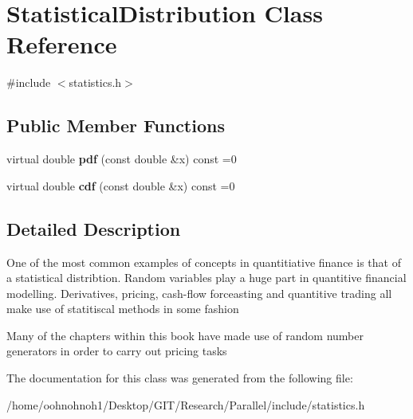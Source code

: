 \hypertarget{classStatisticalDistribution}{}\section{Statistical\+Distribution Class Reference}
\label{classStatisticalDistribution}


{\ttfamily \#include $<$statistics.\+h$>$}

\subsection*{Public Member Functions}
\begin{DoxyCompactItemize}
\item 
\mbox{\label{classStatisticalDistribution_aef1b717d8c6bc58c5b5806d1b935eb12}} 
virtual double {\bfseries pdf} (const double \&x) const =0
\item 
\mbox{\label{classStatisticalDistribution_aa7f52f4c8cadc971d9e189453ea0eb95}} 
virtual double {\bfseries cdf} (const double \&x) const =0
\end{DoxyCompactItemize}


\subsection{Detailed Description}
One of the most common examples of concepts in quantitiative finance is that of a statistical distribtion. Random variables play a huge part in quantitive financial modelling. Derivatives, pricing, cash-\/flow forceasting and quantitive trading all make use of statitiscal methods in some fashion

Many of the chapters within this book have made use of random number generators in order to carry out pricing tasks 

The documentation for this class was generated from the following file\+:\begin{DoxyCompactItemize}
\item 
/home/oohnohnoh1/\+Desktop/\+G\+I\+T/\+Research/\+Parallel/include/statistics.\+h\end{DoxyCompactItemize}
